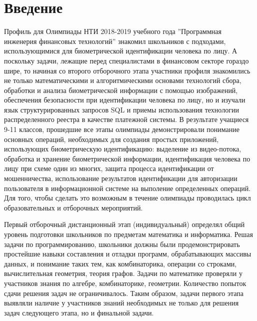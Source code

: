 \documentclass[a4paper,12pt,oneside]{book}
\begin{document}

\setcounter{tocdepth}{1}

\tableofcontents

\chapter{Введение}

Профиль для Олимпиады НТИ 2018-2019 учебного года ''Программная
инженерия финансовых технологий'' знакомил школьников с подходами,
использующимися для биометрической идентификации человека по лицу. А
поскольку задачи, лежащие перед специалистами в финансовом секторе
гораздо шире, то начиная со второго отборочного этапа участники
профиля знакомились не только математическими и алгоритмическими
основами технологий сбора, обработки и анализа биометрической
информации с помощью изображений, обеспечения безопасности при
идентификации человека по лицу, но и изучали язык структурированных
запросов SQL и приемы использования технологии распределенного реестра
в качестве платежной системы. В результате учащиеся 9-11 классов,
прошедшие все этапы олимпиады демонстрировали понимание основных
операций, необходимых для создания простых приложений, использующих
биометрическую идентификацию: выделение из видео-потока, обработка и
хранение биометрической информации, идентификация человека по лицу при
схеме один из многих, защита процесса идентификации от мошенничества,
использование результатов идентификации для авторизации пользователя в
информационной системе на выполение определенных операций. Для того,
чтобы сделать это возможным в течение олимпиады проводилась цикл
образовательных и отборочных мероприятий. 

Первый отборочный дистанционный этап (индивидуальный) определял общий
уровень подготовки школьников по предметам математика и информатика. 
Решая задачи по программированию, школьники должны были
продемонстрировать простейшие навыки составления и отладки программ,
обрабатывающих  массивы данных, и понимание таких тем, как
комбинаторика, операции со строками, вычислительная геометрия, теория
графов. Задачи по математике проверяли у участников  знания по
алгебре, комбинаторике, геометрии. Количество попыток сдачи решения
задач не ограничивалось. Таким образом, задачи первого этапа выявляли
наличие у участников знаний необходимых не только для решения задач
следующего этапа, но и финальной задачи.
\end{document}
